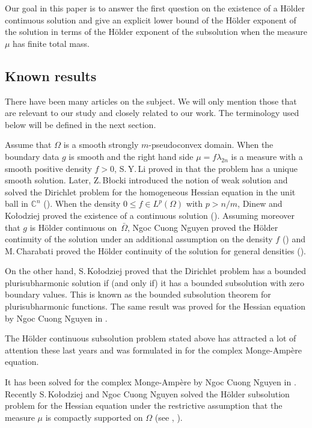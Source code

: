 \documentclass[11pt]{article}
\providecommand{\C}{}
\numberwithin{equation}{section}
\theoremstyle{definition}
\renewcommand{\C}{\mathbb{C}}
\theoremstyle{plain}
\theoremstyle{definition}
\begin{document}
Our goal in this paper is to answer the first question on the existence of a Hölder continuous solution and give an explicit lower bound of the Hölder exponent of the solution in terms of the Hölder exponent of the subsolution when the measure $\mu$ has finite total mass.

\subsection{Known results}
There have been many articles on the subject. We will only mention those that are relevant to our study and closely related to our work.
The terminology used below will be defined in the next section.

Assume that $\Omega$ is a smooth strongly $m$-pseudoconvex domain. When the boundary data $g$ is smooth and the right hand side $\mu = f \lambda_{2n}$ is a measure with a smooth positive density $f > 0$, S.\,Y.\,Li proved in \cite{Li04} that the problem has a unique smooth solution. Later, Z.\,B\l ocki introduced the notion of weak solution and solved the Dirichlet problem for the homogeneous Hessian equation in the unit ball in $\C^n$ (\cite{Bl05}).
When the density $0 \leq f \in L^p (\Omega)$ with $p > n \slash m$, Dinew and Ko\l odziej proved the existence of a continuous solution (\cite{DK14}). Assuming moreover that $g$ is Hölder continuous on~$\bar \Omega$, Ngoc Cuong Nguyen proved the Hölder continuity of the solution under an additional assumption on the density $f$ (\cite{N14}) and M.\,Charabati proved the Hölder continuity of the solution for general densities (\cite{Ch16}).

On the other hand, S.\,Ko\l odziej \cite{Kol05} proved that the Dirichlet problem has a bounded plurisubharmonic solution if (and only if) it has a bounded subsolution with zero boundary values. This is known as the bounded subsolution theorem for plurisubharmonic functions. The same result was proved for the Hessian equation by Ngoc Cuong Nguyen in \cite{N13}.

The Hölder continuous subsolution problem stated above has attracted a lot of attention these last years and was formulated in \cite{DGZ16} for the complex Monge-Ampère equation.

\smallskip
It has been solved for the complex Monge-Ampère by Ngoc Cuong Nguyen in \cite{N18a,N18b}.
Recently S.\,Ko{\l}odziej and Ngoc Cuong Nguyen solved the Hölder subsolution problem for the Hessian equation under the restrictive assumption that the measure $\mu$ is compactly supported on $\Omega$ (see \cite{KN18}, \cite{KN19}).
\end{document}
